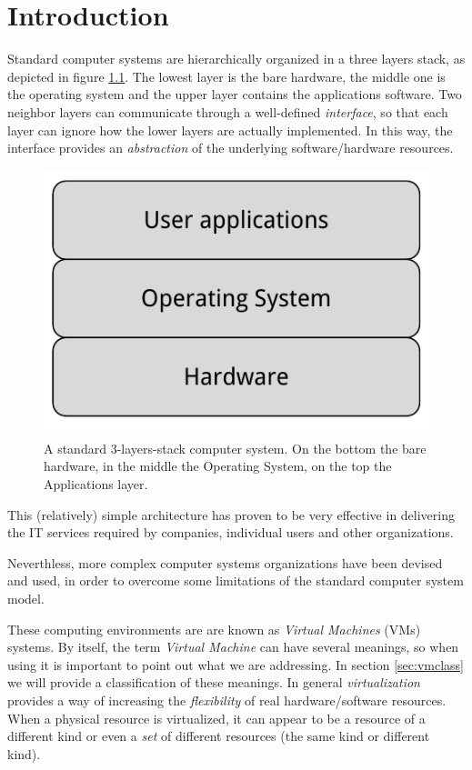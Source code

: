 \chapter{Introduction}

Standard computer systems are hierarchically organized in a three
layers stack, as depicted in figure \ref{fig:3ls}. The lowest layer is the bare hardware, the middle one is the operating system and the 
upper layer contains the applications software.
Two neighbor layers can communicate through a well-defined \emph{interface}, so that each layer can ignore how the
lower layers are actually implemented. In this way, the interface provides an \emph{abstraction} of the underlying software/hardware
resources.

\begin{figure}[bt]
\centering
\includegraphics[scale = 1.0]{3-layers-stack.pdf}
\caption{A standard 3-layers-stack computer system. On the bottom the bare hardware, in the middle the Operating System, on the top
	the Applications layer.}
\label{fig:3ls}
\end{figure}

This (relatively) simple architecture has proven to be very effective in delivering the IT services required
by companies, individual users and other organizations.

\vspace{0.5cm}

Neverthless, more complex computer systems organizations have been devised and used, in order to overcome some limitations
of the standard computer system model.

These computing environments are are known as \emph{Virtual Machines} (VMs) systems.
By itself, the term \emph{Virtual Machine} can have several meanings, so when using it is important to point out what we are
addressing. In section \ref{sec:vmclass} we will provide a classification of these meanings.
In general \emph{virtualization} provides a way of increasing the \emph{flexibility} of real hardware/software resources. When a 
physical resource is virtualized, it can appear to be a resource of a different kind or even a \emph{set} of different
resources (the same kind or different kind).

